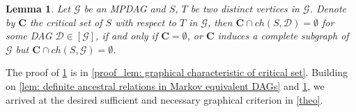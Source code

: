 \documentclass{article}
\newtheorem{lemma}[theorem]{Lemma}
\begin{document}

\begin{lemma}\label{lem: graphical characteristic of critical set}
    Let $\mathcal{G}$ be an MPDAG and $S$, $T$ be two distinct vertices in $\mathcal{G}$. Denote by $\mathbf{C}$ the critical set of $S$ with respect to $T$ in $\mathcal{G}$, then $\mathbf{C} \cap{ch(S, \mathcal D)} = \emptyset$ for some DAG $\mathcal{D} \in [\mathcal{G}]$, if and only if $\mathbf{C} = \emptyset$, or $\mathbf{C}$ induces a complete subgraph of $\mathcal{G}$ but $\mathbf{C} \cap{ch(S,\mathcal{G})}=\emptyset$.
\end{lemma}

 The proof of \cref{lem: graphical characteristic of critical set} is in \cref{proof_lem: graphical characteristic of critical set}. %
Building on \cref{lem: definite ancestral relations in Markov equivalent DAGs} and \cref{lem: graphical characteristic of critical set}, we arrived at the desired sufficient and necessary graphical criterion in \cref{theo}. 
\end{document}
